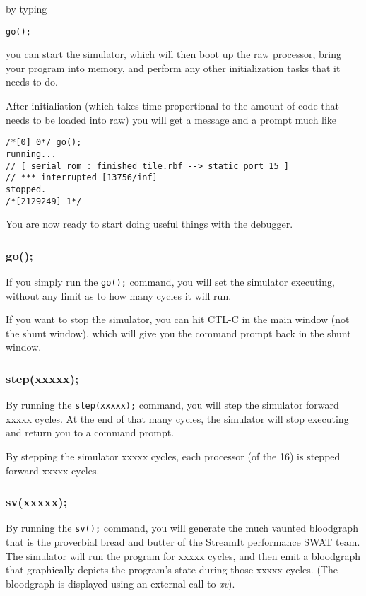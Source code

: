 \documentclass{article}
\begin{document}
by typing 

\begin{verbatim}go();\end{verbatim}

you can start the simulator, which will then boot up the raw processor,  
bring your program into memory, and perform any other initialization tasks 
that it needs to do.

After initialiation (which takes time proportional to the amount of code
that needs to be loaded into raw) you will get a message and a prompt much like

\begin{verbatim}
/*[0] 0*/ go();
running...
// [ serial rom : finished tile.rbf --> static port 15 ]
// *** interrupted [13756/inf]
stopped.
/*[2129249] 1*/ 
\end{verbatim}

You are now ready to start doing useful things with the debugger.

\subsubsection{go();}
If you simply run the \texttt{go();} command, you will set the simulator executing, 
without any limit as to how many cycles it will run.

If you want to stop the simulator, you can hit CTL-C in the main window (not the
shunt window), which will give you the command prompt back in the shunt window.

\subsubsection{step(xxxxx);}
By running the \texttt{step(xxxxx);} command, you will step the simulator 
forward xxxxx cycles. At the end of that many cycles, the simulator 
will stop executing and return you to a command prompt.

By stepping the simulator xxxxx cycles, each processor (of the 16) is stepped
forward xxxxx cycles.

\subsubsection{sv(xxxxx);}
By running the \texttt{sv();} command, you will generate the much vaunted
bloodgraph that is the proverbial bread and butter of the StreamIt performance
SWAT team. The simulator will run the program for xxxxx cycles, and then
emit a bloodgraph that graphically depicts the program's state during those
xxxxx cycles. (The bloodgraph is displayed using an external call to \textit{xv}).
\end{document}
